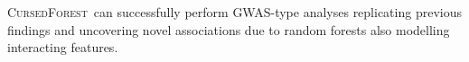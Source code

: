 \documentclass[10pt,letterpaper]{article}
\newlength\savedwidth
\newcommand\thickhline{\noalign{\global\savedwidth\arrayrulewidth\global\arrayrulewidth 2pt}%
\hline
\noalign{\global\arrayrulewidth\savedwidth}}
\newcommand{\cursedforest}{\textsc{CursedForest}\xspace}
\begin{document}

\cursedforest\ can successfully perform GWAS-type analyses replicating previous findings and uncovering novel
associations due to random forests also modelling interacting features.


\end{document}
